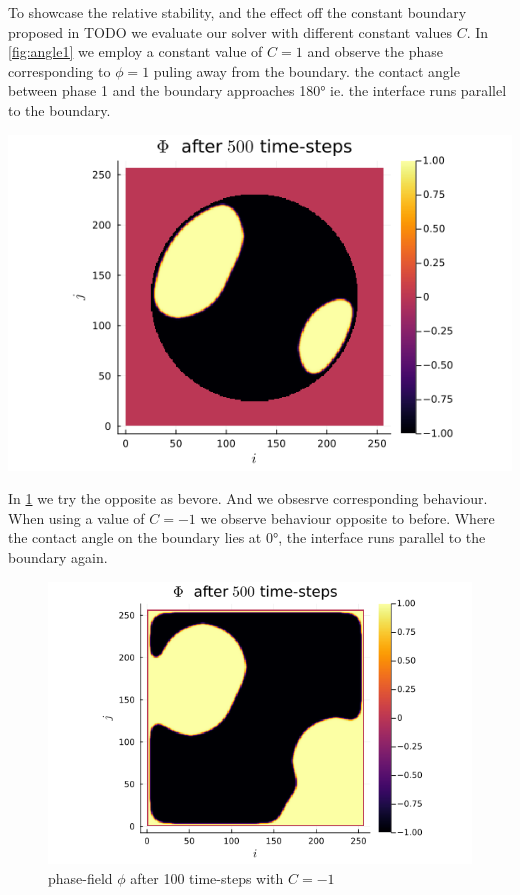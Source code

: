 \documentclass{mimosis}
\begin{document}
To showcase the relative stability, and the effect off the constant boundary proposed in TODO we evaluate our solver with different constant values \(C\). In \ref{fig:angle1} we employ a constant value of \(C=1\) and observe the phase corresponding to \(\phi = 1\) puling away from the boundary. the contact angle between phase 1 and the boundary approaches 180° ie. the interface runs parallel to the boundary.
\begin{center}
\includegraphics[width=.9\linewidth]{images/angle1.png}
\label{fig:angle1}
\end{center}


In \ref{fig:angle-1} we try the opposite as bevore. And we obsesrve corresponding behaviour. When using a value of \(C=-1\) we observe behaviour opposite to before. Where the contact angle on the boundary lies at 0°, the interface runs parallel to the boundary again.
\begin{figure}[htbp]
\centering
\includegraphics[width=.9\linewidth]{images/angle-.png}
\caption{\label{fig:angle-1}phase-field \(\phi\) after 100 time-steps with \(C=-1\)}
\end{figure}
\end{document}

